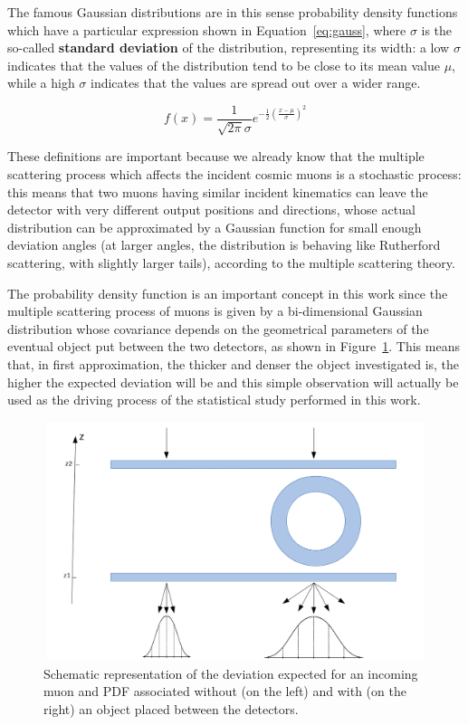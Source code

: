 \documentclass[a4paper, 11pt, twoside, openright]{report}
\begin{document}
The famous Gaussian distributions are in this sense probability density functions which have a particular expression shown in Equation~\ref{eq:gauss}, where $\sigma$ is the so-called \textbf{standard deviation} of the distribution, representing its width: a low $\sigma$ indicates that the values of the distribution tend to be close to its mean value $\mu$, while a high $\sigma$ indicates that the values are spread out over a wider range.

\begin{equation}
\label{eq:gauss}
f(x) = \frac{1}{\sqrt{2 \pi} \sigma} e^{-\frac{1}{2} \left (\frac{x - \mu}{\sigma} \right )^2}
\end{equation}

These definitions are important because we already know that the multiple scattering process which affects the incident cosmic muons is a stochastic process: this means that two muons having similar incident kinematics can leave the detector with very different output positions and directions, whose actual distribution can be approximated by a Gaussian function for small enough deviation angles (at larger angles, the distribution is behaving like Rutherford scattering, with slightly larger tails), according to the multiple scattering theory. 

The probability density function is an important concept in this work since the multiple scattering process of muons is given by a bi-dimensional Gaussian distribution whose covariance depends on the geometrical parameters of the eventual object put between the two detectors, as shown in Figure~\ref{fig:deviation}. This means that, in first approximation, the thicker and denser the object investigated is, the higher the expected deviation will be and this simple observation will actually be used as the driving process of the statistical study performed in this work.

\begin{figure}[htbp]
\centering
\includegraphics[width=11.5cm, height=7cm]{figs/pdfs.png}
\caption{Schematic representation of the deviation expected for an incoming muon and PDF associated without (on the left) and with (on the right) an object placed between the detectors.}
\label{fig:deviation}
\end{figure}
\end{document}
